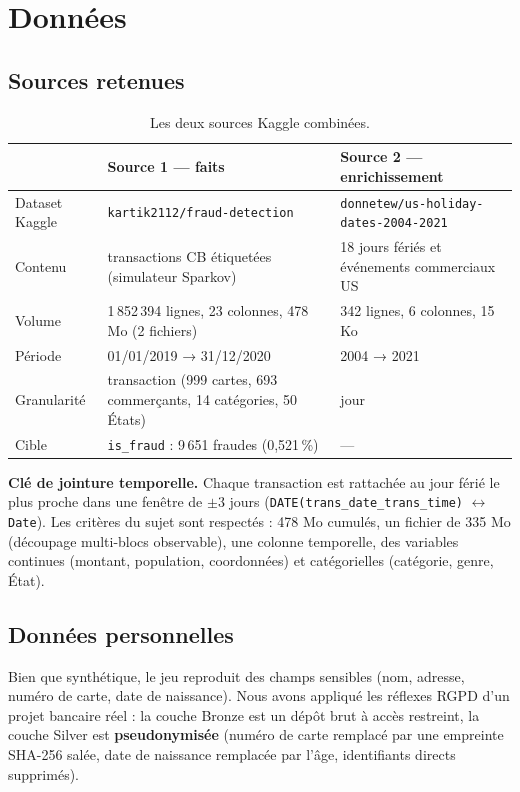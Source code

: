 \documentclass[11pt,a4paper]{article}
\newcommand{\code}[1]{\texttt{\small #1}}
\begin{document}
\section{Données}\label{sec:donnees}

\subsection{Sources retenues}

\begin{table}[H]
\centering\small
\begin{tabularx}{\linewidth}{@{}l Y Y@{}}
\toprule
& \textbf{Source 1 — faits} & \textbf{Source 2 — enrichissement} \\ \midrule
Dataset Kaggle & \code{kartik2112/fraud-detection} & \code{donnetew/us-holiday-dates-2004-2021} \\
Contenu & transactions CB étiquetées (simulateur Sparkov) & 18 jours fériés et événements commerciaux US \\
Volume & 1\,852\,394 lignes, 23 colonnes, 478 Mo (2 fichiers) & 342 lignes, 6 colonnes, 15 Ko \\
Période & 01/01/2019 → 31/12/2020 & 2004 → 2021 \\
Granularité & transaction (999 cartes, 693 commerçants, 14 catégories, 50 États) & jour \\
Cible & \code{is\_fraud} : 9\,651 fraudes (0,521\,\%) & --- \\
\bottomrule
\end{tabularx}
\caption{Les deux sources Kaggle combinées.}
\end{table}

\textbf{Clé de jointure temporelle.} Chaque transaction est rattachée au jour férié le plus proche dans une fenêtre de
$\pm 3$ jours (\code{DATE(trans\_date\_trans\_time)} $\leftrightarrow$ \code{Date}). Les critères du sujet sont respectés :
478 Mo cumulés, un fichier de 335 Mo (découpage multi-blocs observable), une colonne temporelle, des variables continues
(montant, population, coordonnées) et catégorielles (catégorie, genre, État).

\subsection{Données personnelles}
Bien que synthétique, le jeu reproduit des champs sensibles (nom, adresse, numéro de carte, date de naissance). Nous avons appliqué
les réflexes RGPD d'un projet bancaire réel : la couche Bronze est un dépôt brut à accès restreint, la couche Silver est
\textbf{pseudonymisée} (numéro de carte remplacé par une empreinte SHA-256 salée, date de naissance remplacée par l'âge,
identifiants directs supprimés).
\end{document}
